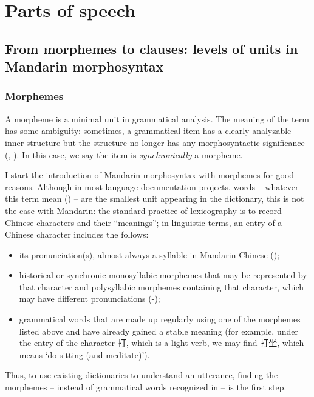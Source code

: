 \documentclass[UTF8, a4paper, oneside, scheme=plain, 12pt]{ctexrep}
\newcommand{\translate}[1]{`#1'}
\begin{document}
\chapter{Parts of speech}

\section{From morphemes to clauses: levels of units in Mandarin morphosyntax}

\subsection{Morphemes}\label{sec:pos.morpheme}

A morpheme is a minimal unit in grammatical analysis.
The meaning of the term has some ambiguity:
sometimes, a grammatical item has a clearly analyzable inner structure 
but the structure no longer has any morphosyntactic significance
(, ).
In this case, we say the item is \emph{synchronically} a morpheme.

I start the introduction of Mandarin morphosyntax 
with morphemes for good reasons. 
Although in most language documentation projects, 
words -- whatever this term mean () -- 
are the smallest unit appearing in the dictionary, 
this is not the case with Mandarin:
the standard practice of lexicography 
is to record Chinese characters and their ``meanings''; 
in linguistic terms, 
an entry of a Chinese character includes the follows:
\begin{itemize}
    \item its pronunciation(s), almost always a syllable in Mandarin Chinese
    (); 
    \item historical or synchronic monosyllabic morphemes that may be represented by that character
    and polysyllabic morphemes containing that character,
    which may have different pronunciations 
    (-);
    \item grammatical words that are made up regularly using one of the morphemes listed above
    and have already gained a stable meaning
    (for example, under the entry of the character 打, 
    which is a light verb,
    we may find 打坐, which means \translate{do sitting (and meditate)}).
\end{itemize}
Thus, to use existing dictionaries to understand an utterance,
finding the morphemes -- instead of grammatical words recognized in  -- 
is the first step.
\end{document}
